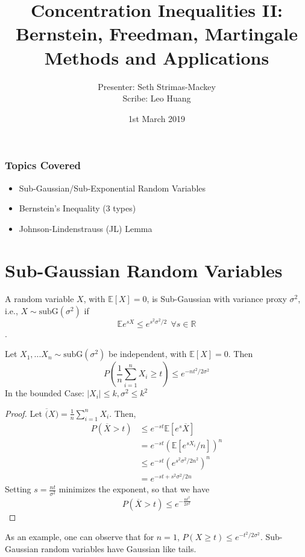 \documentclass[11pt]{article}
\title{Concentration Inequalities II: Bernstein, Freedman, Martingale Methods  and Applications}
\author{Presenter: Seth Strimas-Mackey \\ Scribe: Leo Huang}
\date{1st March 2019}
\begin{document}
\maketitle

\subsubsection*{Topics Covered}
\begin{itemize}
  \item Sub-Gaussian/Sub-Exponential Random Variables
  \item Bernstein's Inequality (3 types)
  \item Johnson-Lindenstrauss (JL) Lemma
\end{itemize}

\section{Sub-Gaussian Random Variables}
\begin{definition}
A random variable $X$, with $\mathbb{E}[X]=0$, is Sub-Gaussian with variance proxy $\sigma^2$, i.e., $X \sim \text{subG}(\sigma^2)$ if $$\mathbb{E}e^{sX}\le e^{s^2\sigma^2/2}~~\forall s\in \mathbb{R}$$.
\end{definition}

\begin{theorem}
Let $X_1, ...X_n\sim \text{subG}(\sigma^2)$ be independent, with $\mathbb{E}[X]=0$. Then
\[P(\frac{1}{n}\sum_{i=1}^nX_i\ge t)\le e^{-nt^2/2\sigma^2}\]
In the bounded Case: $|X_i|\le k, \sigma^2 \leq k^2$
\end{theorem}
\begin{proof}
Let $\overline(X) = \frac{1}{n}\sum_{i=1}^n X_i$. Then, 
\begin{align*}
    P(\overline{X}>t) &\le e^{-st}\mathbb{E}[e^{s}\overline{X}]
    \\ & = e^{-st}(\mathbb{E}[e^{sX_i}/n])^n 
    \\&\le e^{-st}(e^{s^2\sigma^2/2n^2})^n \\& = e^{-st+s^2\sigma^2/2n} 
\end{align*}
Setting $s = \frac{nt}{\sigma^2}$ minimizes the exponent, so that we have 
\[P(\overline{X}>t)\le e^{-\frac{nt^2}{2\sigma^2}}\]
\end{proof}

As an example, one can observe that for $n=1$, $P(X\ge t)\le e^{-t^2/2\sigma^2}$. Sub-Gaussian random variables have Gaussian like tails.
\end{document}
